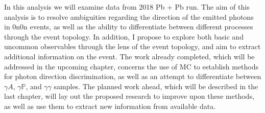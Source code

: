 In this analysis we will examine data from 2018 Pb + Pb run. The aim of this analysis is to resolve ambiguities regarding the direction of the emitted photons in 0n0n events, as well as the ability to differentiate between different processes through the event topology. In addition, I propose to explore both basic and uncommon observables through the lens of the event topology, and aim to extract additional information on the event. The work already completed, which will be addressed in the upcoming chapter, concerns the use of MC to establish methods for photon direction discrimination, as well as an attempt to differentiate between $\gamma A$, $\gamma \mathbb{P}$, and $\gamma\gamma$ samples. The planned work ahead, which will be described in the last chapter, will lay out the proposed research to improve upon these methods, as well as use them to extract new information from available data. 